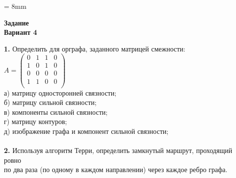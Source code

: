 \documentclass{article}
\begin{document}
\voffset = 8mm
\begin{flushleft}
	\begin{Large}
		\hspace{8mm}\textbf{Задание}
		\vspace{10mm}
		\\
		\hspace{8mm}\textbf{Вариант 4}
	\end{Large}
\end{flushleft}
\vspace{8mm}
\large
\hspace{8mm}\textbf{1.} Определить для орграфа, заданного матрицей смежности:
\vspace{5mm}
\\
\hspace*{50mm}
$A = 
\begin{pmatrix}
	0 & 1 & 1 & 0\\
	1 & 0 & 1 & 0\\
	0 & 0 & 0 & 0\\
	1 & 1 & 0 & 0\\
\end{pmatrix}$
\vspace{5mm}
\\
\hspace*{12mm} а) матрицу односторонней связности;
\\
\hspace*{12mm} б) матрицу сильной связности;
\\
\hspace*{12mm} в) компоненты сильной связности;
\\
\hspace*{12mm} г) матрицу контуров;
\\
\hspace*{12mm} д) изображение графа и компонент сильной связности;
\\
\\
\hspace*{8mm}\textbf{2.} Используя алгоритм Терри, определить замкнутый маршрут, проходящий ровно
\\
\hspace*{12mm} по два раза (по одному в каждом направлении) через каждое ребро графа.
\vspace{5mm}
\\
\end{document}
